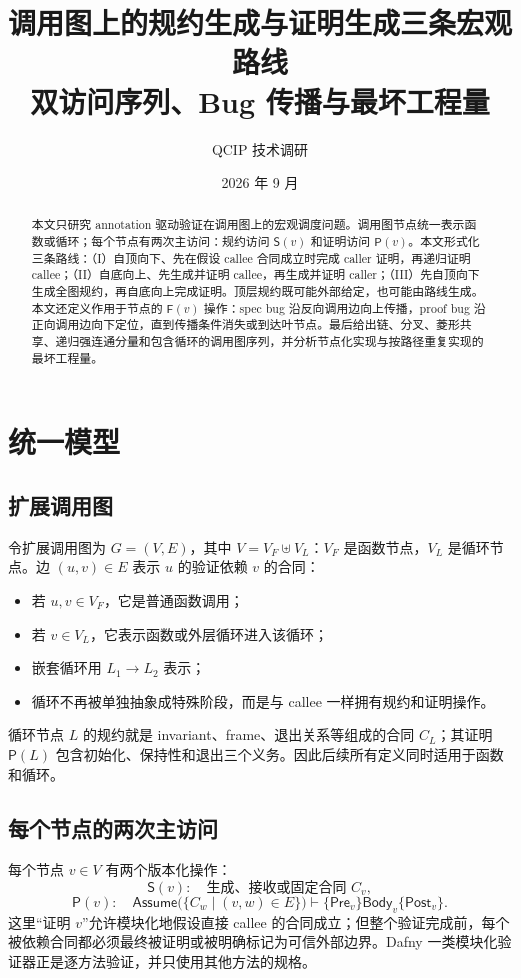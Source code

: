 \documentclass[UTF8,a4paper,11pt]{ctexart}
\title{调用图上的规约生成与证明生成三条宏观路线\\
\large 双访问序列、Bug 传播与最坏工程量}
\author{QCIP 技术调研}
\date{2026 年 9 月}
\newcommand{\SpecOp}{\mathsf{S}}
\newcommand{\ProofOp}{\mathsf{P}}
\newcommand{\FindBug}{\mathsf{F}}
\newcommand{\Pre}{\mathsf{Pre}}
\newcommand{\Post}{\mathsf{Post}}
\newcommand{\Body}{\mathsf{Body}}
\newcommand{\Assume}{\mathsf{Assume}}
\begin{document}
\maketitle

\begin{abstract}
本文只研究 annotation 驱动验证在调用图上的宏观调度问题。调用图节点统一表示函数或循环；每个节点有两次主访问：规约访问 $\SpecOp(v)$ 和证明访问 $\ProofOp(v)$。本文形式化三条路线：（I）自顶向下、先在假设 callee 合同成立时完成 caller 证明，再递归证明 callee；（II）自底向上、先生成并证明 callee，再生成并证明 caller；（III）先自顶向下生成全图规约，再自底向上完成证明。顶层规约既可能外部给定，也可能由路线生成。本文还定义作用于节点的 $\FindBug(v)$ 操作：spec bug 沿反向调用边向上传播，proof bug 沿正向调用边向下定位，直到传播条件消失或到达叶节点。最后给出链、分叉、菱形共享、递归强连通分量和包含循环的调用图序列，并分析节点化实现与按路径重复实现的最坏工程量。
\end{abstract}

\section{统一模型}

\subsection{扩展调用图}

令扩展调用图为 $G=(V,E)$，其中 $V=V_F\uplus V_L$：$V_F$ 是函数节点，$V_L$ 是循环节点。边 $(u,v)\in E$ 表示 $u$ 的验证依赖 $v$ 的合同：
\begin{itemize}
  \item 若 $u,v\in V_F$，它是普通函数调用；
  \item 若 $v\in V_L$，它表示函数或外层循环进入该循环；
  \item 嵌套循环用 $L_1\to L_2$ 表示；
  \item 循环不再被单独抽象成特殊阶段，而是与 callee 一样拥有规约和证明操作。
\end{itemize}

循环节点 $L$ 的规约就是 invariant、frame、退出关系等组成的合同 $C_L$；其证明 $\ProofOp(L)$ 包含初始化、保持性和退出三个义务。因此后续所有定义同时适用于函数和循环。

\subsection{每个节点的两次主访问}

每个节点 $v\in V$ 有两个版本化操作：
\[
  \SpecOp(v):\quad \text{生成、接收或固定合同 }C_v,
\]
\[
  \ProofOp(v):\quad
  \Assume\bigl(\{C_w\mid(v,w)\in E\}\bigr)
  \vdash \{\Pre_v\}\Body_v\{\Post_v\}.
\]
这里“证明 $v$”允许模块化地假设直接 callee 的合同成立；但整个验证完成前，每个被依赖合同都必须最终被证明或被明确标记为可信外部边界。Dafny 一类模块化验证器正是逐方法验证，并只使用其他方法的规格\cite{Leino2010Dafny}。
\end{document}
